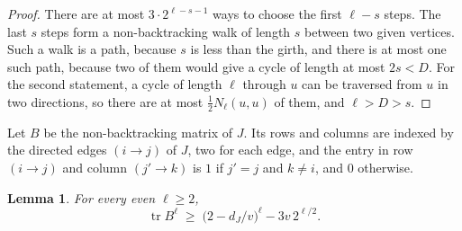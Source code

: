 \documentclass[11pt]{article}
\newtheorem{lemma}[theorem]{Lemma}
\theoremstyle{definition}
\theoremstyle{remark}
\newcommand{\tr}{\operatorname{tr}}
\newcommand{\half}{\tfrac12}
\begin{document}
\begin{proof}
There are at most $3\cdot2^{\ell-s-1}$ ways to choose the first $\ell-s$ steps. The last $s$ steps
form a non-backtracking walk of length $s$ between two given vertices. Such a walk is a path,
because $s$ is less than the girth, and there is at most one such path, because two of them would
give a cycle of length at most $2s<D$. For the second statement, a cycle of length $\ell$ through $u$
can be traversed from $u$ in two directions, so there are at most $\half N_\ell(u,u)$ of them, and
$\ell>D>s$.
\end{proof}

Let $B$ be the non-backtracking matrix of $J$. Its rows and columns are indexed by the directed
edges $(i\to j)$ of $J$, two for each edge, and the entry in row $(i\to j)$ and column $(j'\to k)$
is $1$ if $j'=j$ and $k\ne i$, and $0$ otherwise.

\begin{lemma}\label{lem:spectrum}
For every even $\ell\ge2$,
\[
  \tr B^{\ell}\;\ge\;\bigl(2-d_J/v\bigr)^{\ell}-3v\,2^{\ell/2}.
\]
\end{lemma}
\end{document}
